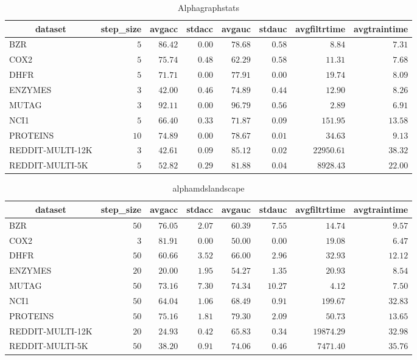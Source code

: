 \begin{table}[!tbp]
\caption{Alphagraphstats\label{Alphagraphstats}} 
{\centering
\begin{tabular}{lrrrrrrr}
\hline\hline
\multicolumn{1}{c}{dataset}&\multicolumn{1}{c}{step_size}&\multicolumn{1}{c}{avgacc}&\multicolumn{1}{c}{stdacc}&\multicolumn{1}{c}{avgauc}&\multicolumn{1}{c}{stdauc}&\multicolumn{1}{c}{avgfiltrtime}&\multicolumn{1}{c}{avgtraintime}\tabularnewline
\hline
BZR&$ 5$&$86.42$&$0.00$&$78.68$&$0.58$&$    8.84$&$ 7.31$\tabularnewline
COX2&$ 5$&$75.74$&$0.48$&$62.29$&$0.58$&$   11.31$&$ 7.68$\tabularnewline
DHFR&$ 5$&$71.71$&$0.00$&$77.91$&$0.00$&$   19.74$&$ 8.09$\tabularnewline
ENZYMES&$ 3$&$42.00$&$0.46$&$74.89$&$0.44$&$   12.90$&$ 8.26$\tabularnewline
MUTAG&$ 3$&$92.11$&$0.00$&$96.79$&$0.56$&$    2.89$&$ 6.91$\tabularnewline
NCI1&$ 5$&$66.40$&$0.33$&$71.87$&$0.09$&$  151.95$&$13.58$\tabularnewline
PROTEINS&$10$&$74.89$&$0.00$&$78.67$&$0.01$&$   34.63$&$ 9.13$\tabularnewline
REDDIT-MULTI-12K&$ 3$&$42.61$&$0.09$&$85.12$&$0.02$&$22950.61$&$38.32$\tabularnewline
REDDIT-MULTI-5K&$ 5$&$52.82$&$0.29$&$81.88$&$0.04$&$ 8928.43$&$22.00$\tabularnewline
\hline
\end{tabular}}
\end{table}
\begin{table}[!tbp]
\caption{alphamdslandscape\label{alphamdslandscape}} 
{\centering
\begin{tabular}{lrrrrrrr}
\hline\hline
\multicolumn{1}{c}{dataset}&\multicolumn{1}{c}{step_size}&\multicolumn{1}{c}{avgacc}&\multicolumn{1}{c}{stdacc}&\multicolumn{1}{c}{avgauc}&\multicolumn{1}{c}{stdauc}&\multicolumn{1}{c}{avgfiltrtime}&\multicolumn{1}{c}{avgtraintime}\tabularnewline
\hline
BZR&$50$&$76.05$&$2.07$&$60.39$&$ 7.55$&$   14.74$&$ 9.57$\tabularnewline
COX2&$ 3$&$81.91$&$0.00$&$50.00$&$ 0.00$&$   19.08$&$ 6.47$\tabularnewline
DHFR&$50$&$60.66$&$3.52$&$66.00$&$ 2.96$&$   32.93$&$12.12$\tabularnewline
ENZYMES&$20$&$20.00$&$1.95$&$54.27$&$ 1.35$&$   20.93$&$ 8.54$\tabularnewline
MUTAG&$50$&$73.16$&$7.30$&$74.34$&$10.27$&$    4.12$&$ 7.50$\tabularnewline
NCI1&$50$&$64.04$&$1.06$&$68.49$&$ 0.91$&$  199.67$&$32.83$\tabularnewline
PROTEINS&$50$&$75.16$&$1.81$&$79.30$&$ 2.09$&$   50.73$&$13.65$\tabularnewline
REDDIT-MULTI-12K&$20$&$24.93$&$0.42$&$65.83$&$ 0.34$&$19874.29$&$32.98$\tabularnewline
REDDIT-MULTI-5K&$50$&$38.20$&$0.91$&$74.06$&$ 0.46$&$ 7471.40$&$35.76$\tabularnewline
\hline
\end{tabular}}
\end{table}
